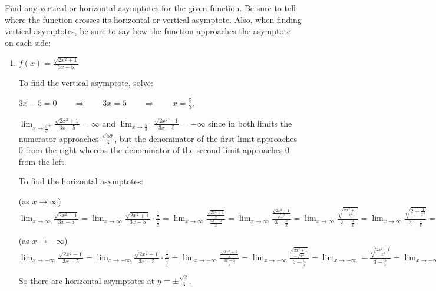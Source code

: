 \documentclass[handout,nooutcomes]{ximera}
\begin{document}
\begin{problem}
Find any vertical or horizontal asymptotes for the given function.  Be sure to tell where the function crosses its horizontal or vertical asymptote.  Also, when finding vertical asymptotes, be sure to say how the function approaches the asymptote on each side:

	\begin{enumerate}
	
	\item  $f(x) = \frac{\sqrt{2x^2 + 1}}{3x-5}$
		
		\begin{freeResponse}
		To find the vertical asymptote, solve:
		
		$3x-5=0 \qquad \Longrightarrow \qquad 3x = 5 \qquad \Longrightarrow \qquad x = \frac{5}{3}.$
		
		$\lim_{x \to \frac{5}{3}^+} \frac{\sqrt{2x^2 + 1}}{3x-5} = \infty$ and $\lim_{x \to \frac{5}{3}^-} \frac{\sqrt{2x^2 + 1}}{3x-5} = - \infty$ since in both limits the numerator approaches $\frac{\sqrt{59}}{3}$, but the denominator of the first limit approaches $0$ from the right whereas the denominator of the second limit approaches $0$ from the left.
		
		To find the horizontal asymptotes:
		
		(as $x \to \infty$)  $\lim_{x \to \infty} \frac{\sqrt{2x^2 + 1}}{3x-5} 
		= \lim_{x \to \infty} \frac{\sqrt{2x^2 + 1}}{3x-5} \cdot \frac{\frac{1}{x}}{\frac{1}{x}} 
		= \lim_{x \to \infty} \frac{\frac{\sqrt{2x^2 + 1}}{x}}{\frac{3x-5}{x}} 
		= \lim_{x \to \infty}  \frac{\frac{\sqrt{2x^2 + 1}}{\sqrt{x^2}}}{3 - \frac{5}{x}} 
		= \lim_{x \to \infty}  \frac{\sqrt{\frac{2x^2 + 1}{x^2}}}{3 - \frac{5}{x}} 
		= \lim_{x \to \infty}  \frac{\sqrt{2 + \frac{1}{x^2}}}{3 - \frac{5}{x}} 
		= \frac{\sqrt{2+0}}{3-0} 
		= \frac{\sqrt{2}}{3} $
		
		(as $x \to -\infty$)  $\lim_{x \to -\infty} \frac{\sqrt{2x^2 + 1}}{3x-5} 
		= \lim_{x \to -\infty} \frac{\sqrt{2x^2 + 1}}{3x-5} \cdot \frac{\frac{1}{x}}{\frac{1}{x}} 
		= \lim_{x \to -\infty} \frac{\frac{\sqrt{2x^2 + 1}}{x}}{\frac{3x-5}{x}} 
		= \lim_{x \to -\infty}  \frac{\frac{\sqrt{2x^2 + 1}}{-\sqrt{x^2}}}{3 - \frac{5}{x}} 
		= \lim_{x \to -\infty}  -\frac{\sqrt{\frac{2x^2 + 1}{x^2}}}{3 - \frac{5}{x}} 
		= \lim_{x \to -\infty}  -\frac{\sqrt{2 + \frac{1}{x^2}}}{3 - \frac{5}{x}} 
		= -\frac{\sqrt{2+0}}{3-0} 
		= -\frac{\sqrt{2}}{3} $
		
		So there are horizontal asymptotes at $y = \pm \frac{\sqrt{2}}{3}$.  
		

\end{freeResponse}
\end{enumerate}
\end{problem}
\end{document}
